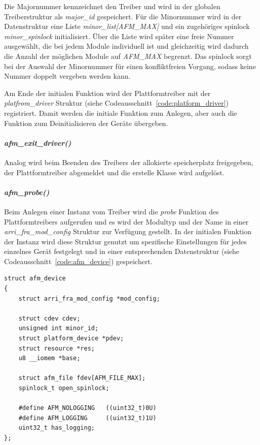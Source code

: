 Die Majornummer kennzeichnet den Treiber und wird in der globalen Treiberstruktur als \textit{major\_id} gespeichert. Für die Minornummer wird in der Datenstruktur eine Liste \textit{minor\_list[AFM\_MAX]} und ein zugehöriges \gls{spinlock} \textit{minor\_spinlock} initialisiert. Über die Liste wird später eine freie Nummer ausgewählt, die bei jedem Module individuell ist und gleichzeitig wird dadurch die Anzahl der möglichen Module auf \textit{AFM\_MAX} begrenzt. Das \gls{spinlock} sorgt bei der Auswahl der Minornummer für einen konfliktfreien Vorgang, sodass keine Nummer doppelt vergeben werden kann. 


Am Ende der initialen Funktion wird der Plattformtreiber mit der \textit{platfrom\_driver} Struktur (siehe Codeausschnitt~\ref{code:platform_driver}) registriert. Damit werden die initiale Funktion zum Anlegen, aber auch die Funktion zum Deinitialisieren der Geräte übergeben.


\paragraph*{\textit{afm\_exit\_driver()}}
Analog wird beim Beenden des Treibers der allokierte speicherplatz freigegeben, der Plattformtreiber abgemeldet und die erstelle Klasse wird aufgelöst.


\paragraph*{\textit{afm\_probe()}}
Beim Anlegen einer Instanz vom Treiber wird die \textit{probe} Funktion des Plattformtreibers aufgerufen und es wird der Modultyp und der Name in einer \textit{arri\_fra\_mod\_config} Struktur zur Verfügung gestellt. In der initialen Funktion der Instanz wird diese Struktur genutzt um spezifische Einstellungen für jedes einzelnes Gerät festgelegt und in einer entsprechenden Datenstruktur (siehe Codeausschnitt~\ref{code:afm_device}) gespeichert. 

\begin{lstfloat}
\begin{lstlisting}
struct afm_device 
{
	struct arri_fra_mod_config *mod_config;

	struct cdev cdev;
	unsigned int minor_id;
	struct platform_device *pdev;
	struct resource *res;
	u8 __iomem *base;
	
	struct afm_file fdev[AFM_FILE_MAX];
	spinlock_t open_spinlock;
	
	#define AFM_NOLOGGING   ((uint32_t)0U)
	#define AFM_LOGGING     ((uint32_t)1U)
	uint32_t has_logging;
};
\end{lstlisting}
\end{lstfloat}

